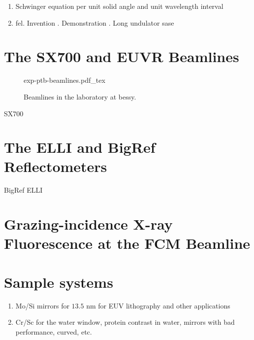 \begin{enumerate}
 \item Schwinger equation per unit solid angle and unit wavelength interval
 \item \gls{fel}. Invention \cite{madey_stimulated_1971}. Demonstration \cite{deacon_first_1977}. Long undulator \gls{sase} \cite{derbenev_possibility_1982, bonifacio_collective_1984}
\end{enumerate}

\section{The SX700 and EUVR Beamlines}
\begin{figure}[htb]
    \def\svgwidth{\textwidth}
    {exp-ptb-beamlines.pdf_tex}
    \caption[PTB Beamlines in the BESSY II laboratory.]{Beamlines in the laboratory at \gls{bessy}.}
    \label{ch_exp:fig_beamlines_bessy}
\end{figure}
SX700 \cite{beckhoff_quarter-century_2009}
\section{The ELLI and BigRef Reflectometers}
BigRef \cite{scholze_high-accuracy_2001}
ELLI \cite{soltwisch_polarization_2015}
\section{Grazing-incidence X-ray Fluorescence at the FCM Beamline}

\section{Sample systems}
\begin{enumerate}
 \item Mo/Si mirrors for $13.5$ nm for EUV lithography and other applications
 \item Cr/Sc for the water window, protein contrast in water, mirrors with bad performance, curved, etc.
\end{enumerate}
